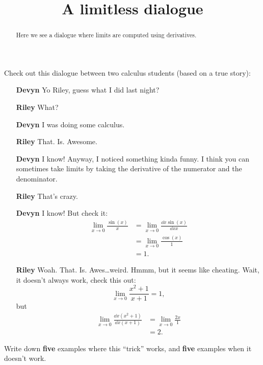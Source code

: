 \documentclass{ximera}
\title[Break-Ground:]{A limitless dialogue}
\begin{document}
\begin{abstract}
Here we see a dialogue where limits are computed using derivatives.
\end{abstract}
\maketitle

Check out this dialogue between two calculus students (based on a true
story):

\begin{itemize}
\item[\textbf{Devyn}] Yo Riley, guess what I did last night?
\item[\textbf{Riley}] What?
\item[\textbf{Devyn}] I was doing some calculus.
\item[\textbf{Riley}] That. Is. Awesome.
\item[\textbf{Devyn}] I know! Anyway, I noticed something kinda funny. I
  think you can sometimes take limits by taking the derivative of the
  numerator and the denominator.
\item[\textbf{Riley}] That's crazy.
\item[\textbf{Devyn}] I know! But check it:
  \begin{align*}
    \lim_{x\to 0} \frac{\sin(x)}{x} &= \lim_{x\to 0} \frac{\dd{x}\sin(x)}{\dd{x}x}\\
    &= \lim_{x\to 0} \frac{\cos(x)}{1}\\
    &=1.
  \end{align*}
  \item[\textbf{Riley}] Woah. That. Is. Awes\dots weird. Hmmm, but it seems like
    cheating. Wait, it doesn't always work, check this out:
    \[
    \lim_{x\to 0} \frac{x^2+1}{x+1} = 1,
    \]
    but
    \begin{align*}
      \lim_{x\to 0} \frac{\dd{x}\left(x^2+1\right)}{\dd{x}\left(x+1\right)} &=
      \lim_{x\to 0} \frac{2x}{1} \\
      &=2.
    \end{align*}
\end{itemize}

\begin{problem}
  Write down \textbf{five} examples where this ``trick'' works, and
  \textbf{five} examples when it doesn't work.
  \begin{freeResponse}
\end{freeResponse}
\end{problem}
\end{document}
